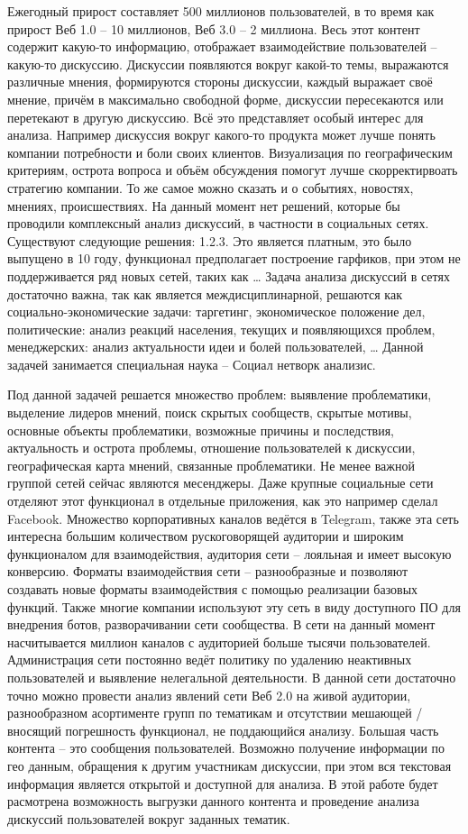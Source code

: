 \documentclass[a4paper,article,14pt]{extarticle}
\begin{document}
Ежегодный прирост составляет 500 миллионов пользователей, в то время как прирост Веб 1.0 – 10 миллионов, Веб 3.0 – 2 миллиона.
Весь этот контент содержит какую-то информацию, отображает взаимодействие пользователей – какую-то дискуссию. Дискуссии появляются вокруг какой-то темы, выражаются различные мнения, формируются стороны дискуссии, каждый выражает своё мнение, причём в максимально свободной форме, дискуссии пересекаются или перетекают в другую дискуссию. Всё это представляет особый интерес для анализа. Например дискуссия вокруг какого-то продукта может лучше понять компании потребности и боли своих клиентов. Визуализация по географическим критериям, острота вопроса и объём обсуждения помогут лучше скорректирвоать стратегию компании. То же самое можно сказать и о событиях, новостях, мнениях, происшествиях.
На данный момент нет решений, которые бы проводили комплексный анализ дискуссий, в частности в социальных сетях. Существуют следующие решения: 1.2.3. Это является платным, это было выпущено в 10 году, функционал предполагает построение гарфиков, при этом не поддерживается ряд новых сетей, таких как …
Задача анализа дискуссий в сетях достаточно важна, так как является междисциплинарной, решаются как социально-экономические задачи: таргетинг, экономическое положение дел, политические: анализ реакций населения,  текущих и появляющихся проблем, менеджерских: анализ актуальности идеи и болей пользователей, … Данной задачей занимается специальная наука – Социал нетворк анализис.

Под данной задачей решается множество проблем: выявление проблематики, выделение лидеров мнений, поиск скрытых сообществ, скрытые мотивы, основные объекты проблематики, возможные причины и последствия, актуальность и острота проблемы, отношение пользователей к дискуссии, географическая карта мнений, связанные проблематики.
Не менее важной группой сетей сейчас являются месенджеры. Даже крупные социальные сети отделяют этот функционал в отдельные приложения, как это например сделал Facebook. Множество корпоративных каналов ведётся в Telegram, также эта сеть интересна большим количеством рускоговорящей аудитории и широким функционалом для взаимодействия, аудитория сети – лояльная и имеет высокую конверсию. Форматы взаимодействия сети – разнообразные и позволяют создавать новые форматы взаимодействия с помощью реализации базовых функций. Также многие компании используют эту сеть в виду доступного ПО для внедрения ботов, разворачивании сети сообщества. В сети на данный момент насчитывается миллион каналов с аудиторией больше тысячи пользователей. Администрация сети постоянно ведёт политику по удалению неактивных пользователей и выявление нелегальной деятельности. В данной сети достаточно точно можно провести анализ явлений сети Веб 2.0 на живой аудитории, разнообразном асортименте групп по тематикам и отсутствии мешающей / вносящий погрешность функционал, не поддающийся анализу. Большая часть контента – это сообщения пользователей. Возможно получение информации по гео данным, обращения к другим участникам дискуссии, при этом вся текстовая информация является открытой и доступной для анализа.
В этой работе будет расмотрена возможность выгрузки данного контента и проведение анализа дискуссий пользователей вокруг заданных тематик.
\end{document}
